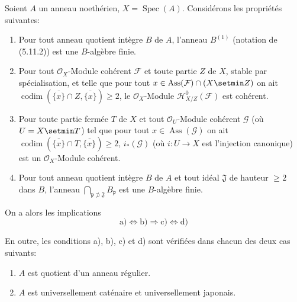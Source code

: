 \begin{corollary}[5.11.6]
\label{IV.2.s5.11.6-fr}
Soient $A$ un anneau noethérien, $X=\operatorname{Spec}(A)$. Considérons les
propriétés suivantes:
\begin{enumerate}
\item[\textup{a)}] Pour tout anneau quotient intègre $B$ de $A$, l'anneau $B^{(1)}$
\textup{(notation de (5.11.2))} est une $B$-algèbre finie.
\item[\textup{b)}] Pour tout $\mathcal O_X$-Module cohérent $\mathcal F$ et toute partie
$Z$ de $X$, stable par spécialisation, et telle que pour tout
$x\in\operatorname{Ass}(\mathcal F)\cap(X\setmin Z)$ on ait
$\operatorname{codim}(\overline{\{x\}}\cap Z,\overline{\{x\}})\geq2$, le
$\mathcal O_X$-Module $\mathcal H^0_{X/Z}(\mathcal F)$ est cohérent.
\item[\textup{c)}] Pour toute partie fermée $T$ de $X$ et tout $\mathcal O_U$-Module
cohérent $\mathcal G$ (où $U=X\setmin T$) tel que pour tout
$x\in\operatorname{Ass}(\mathcal G)$ on ait
$\operatorname{codim}(\overline{\{x\}}\cap T,\overline{\{x\}})\geq2$,
$i_*(\mathcal G)$ (où $i:U\to X$ est l'injection canonique) est un
$\mathcal O_X$-Module cohérent.
\item[\textup{d)}] Pour tout anneau quotient intègre $B$ de $A$ et tout idéal
$\mathfrak J$ de hauteur $\geq2$ dans $B$, l'anneau
$\bigcap_{\mathfrak p\not\supset\mathfrak J}B_\mathfrak p$
est une $B$-algèbre finie.
\end{enumerate}
On a alors les implications
\[
\mathrm a)\Longleftrightarrow\mathrm b)\Longrightarrow\mathrm c)
\Longleftrightarrow\mathrm d)
\]

En outre, les conditions \textup{a), b), c)} et \textup{d)} sont vérifiées dans chacun des deux
cas suivants:
\begin{enumerate}
\item[\textup{(i)}] $A$ est quotient d'un anneau régulier.
\item[\textup{(ii)}] $A$ est universellement caténaire et universellement japonais.
\end{enumerate}
\end{corollary}

